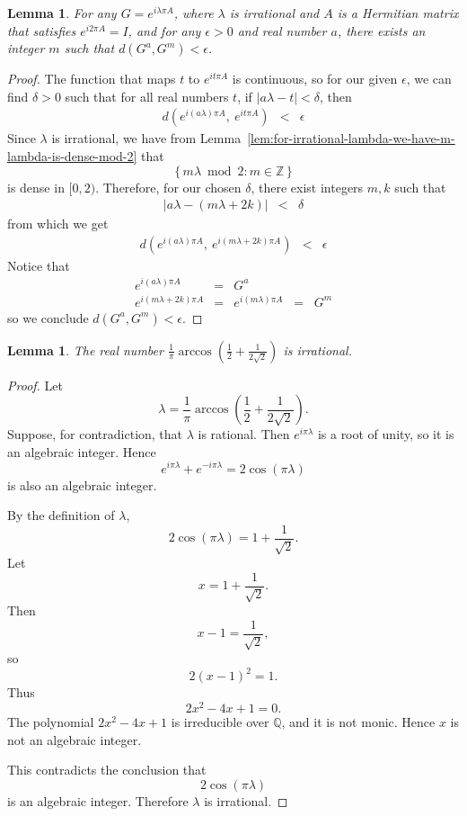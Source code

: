 \documentclass[11pt]{article}
\def\({\begin{eqnarray*}}
\def\){\end{eqnarray*}}
\newtheorem{lemma}[theorem]{Lemma}
\begin{document}
\begin{lemma}
\label{lem:approximate-g-to-the-m-when-is-a-rotation-by-an-irr-multiple-of-pi}
For any $G = e^{i\lambda \pi A}$, where $\lambda$ is irrational and
$A$ is a Hermitian matrix that satisfies $e^{i 2 \pi A} = I$, 
and for any $\epsilon > 0$ and real number $a$, 
there exists an integer $m$ such that 
$d(G^a, G^m) < \epsilon$.
\end{lemma}

\begin{proof}
% 
The function that maps $t$ to $e^{i t \pi A}$ is continuous,
so for our given $\epsilon$, we can find $\delta > 0$ such that
for all real numbers $t$, if $|a\lambda - t| < \delta$, then 
\(
d(e^{i (a \lambda) \pi A},\ e^{i t \pi A}) 
&<&
\epsilon
\)
Since $\lambda$ is irrational, we have from
Lemma~\ref{lem:for-irrational-lambda-we-have-m-lambda-is-dense-mod-2} 
that 
\[
\{\,m\lambda \bmod 2 : m\in\mathbb Z\,\}
\]
is dense in $[0,2)$.
Therefore, for our chosen $\delta$, there exist integers $m, k$ such that
\(
|a\lambda - (m \lambda + 2k)| &<& \delta
\)
from which we get
\(
d(e^{i (a \lambda) \pi A},\ e^{i (m \lambda + 2k) \pi A})
&<&
\epsilon
\)
Notice that
\(
e^{i (a \lambda) \pi A} 
&=&
G^a
\\
e^{i (m \lambda + 2k) \pi A}
&=&
e^{i (m \lambda) \pi A}
\;\;=\;\;
G^m
\)
so we conclude 
$d(G^a, G^m) < \epsilon$.
\end{proof}

\begin{lemma}
\label{lem:a-specific-lambda-is-irrational}
The real number $\frac{1}{\pi}
\arccos\!\left(
\frac{1}{2}
+
\frac{1}{2\sqrt{2}}
\right)$
is irrational.
\end{lemma}

\begin{proof}
Let
\[
\lambda
=
\frac{1}{\pi}
\arccos\!\left(
\frac12+\frac{1}{2\sqrt2}
\right).
\]
Suppose, for contradiction, that $\lambda$ is rational.
Then $e^{i\pi\lambda}$ is a root of unity, so it is an algebraic integer.
Hence
\[
e^{i\pi\lambda}+e^{-i\pi\lambda}
=
2\cos(\pi\lambda)
\]
is also an algebraic integer.

By the definition of $\lambda$,
\[
2\cos(\pi\lambda)
=
1+\frac{1}{\sqrt{2}}.
\]
Let
\[
x=1+\frac{1}{\sqrt{2}}.
\]
Then
\[
x-1=\frac{1}{\sqrt{2}},
\]
so
\[
2(x-1)^2=1.
\]
Thus
\[
2x^2-4x+1=0.
\]
The polynomial $2x^2-4x+1$ is irreducible over $\mathbb{Q}$, and it is
not monic. Hence $x$ is not an algebraic integer.

This contradicts the conclusion that
\[
2\cos(\pi\lambda)
\]
is an algebraic integer. Therefore $\lambda$ is irrational.
\end{proof}
\end{document}
